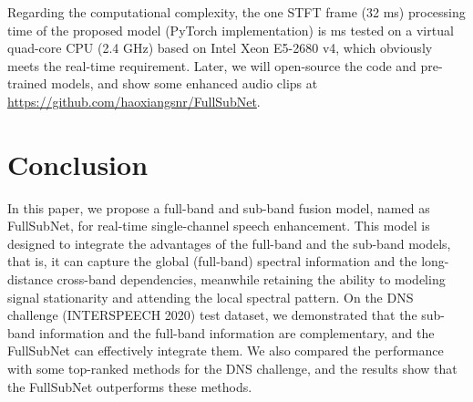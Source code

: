 \documentclass{article}
\begin{document}
Regarding the computational complexity, the one STFT frame (32 ms) processing time of the proposed model (PyTorch implementation) is  ms tested on a virtual quad-core CPU (2.4 GHz) based on Intel Xeon E5-2680 v4, which obviously meets the real-time requirement. 
Later, we will open-source the code and pre-trained models, and show some enhanced audio clips at {\footnotesize\url{https://github.com/haoxiangsnr/FullSubNet}}.

\section{Conclusion}
In this paper, we propose a full-band and sub-band fusion model, named as FullSubNet, for real-time single-channel speech enhancement.
This model is designed to integrate the advantages of the full-band and the sub-band models, that is, it can capture the global (full-band) spectral information and the long-distance cross-band dependencies, meanwhile retaining the ability to modeling signal stationarity and attending the local spectral pattern.
On the DNS challenge (INTERSPEECH 2020) test dataset, we demonstrated that the sub-band information and the full-band information are complementary, and the FullSubNet can effectively integrate them. We also compared the performance with some top-ranked methods for the DNS challenge, and the results show that the FullSubNet outperforms these methods.


\end{document}
